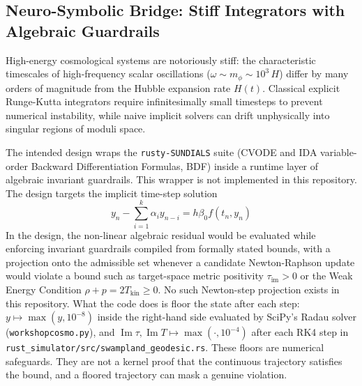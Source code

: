 \documentclass[11pt,a4paper]{article}
\begin{document}
\subsection{Neuro-Symbolic Bridge: Stiff Integrators with Algebraic Guardrails}
High-energy cosmological systems are notoriously stiff: the characteristic timescales of high-frequency scalar oscillations ($\omega \sim m_\phi \sim 10^3\,H$) differ by many orders of magnitude from the Hubble expansion rate $H(t)$. Classical explicit Runge-Kutta integrators require infinitesimally small timesteps to prevent numerical instability, while naive implicit solvers can drift unphysically into singular regions of moduli space.

The intended design wraps the \texttt{rusty-SUNDIALS} suite (CVODE and IDA variable-order Backward Differentiation Formulas, BDF) inside a runtime layer of algebraic invariant guardrails. This wrapper is not implemented in this repository. The design targets the implicit time-step solution
\begin{equation}
y_n - \sum_{i=1}^k \alpha_i y_{n-i} = h \beta_0 f(t_n, y_n)
\end{equation}
In the design, the non-linear algebraic residual would be evaluated while enforcing invariant guardrails compiled from formally stated bounds, with a projection onto the admissible set whenever a candidate Newton-Raphson update would violate a bound such as target-space metric positivity $\tau_{\text{im}} > 0$ or the Weak Energy Condition $\rho + p = 2 T_{\text{kin}} \ge 0$. No such Newton-step projection exists in this repository. What the code does is floor the state after each step: $y \mapsto \max(y, 10^{-8})$ inside the right-hand side evaluated by SciPy's Radau solver (\texttt{workshopcosmo.py}), and $\operatorname{Im}\tau, \operatorname{Im}T \mapsto \max(\cdot, 10^{-4})$ after each RK4 step in \texttt{rust\_simulator/src/swampland\_geodesic.rs}. These floors are numerical safeguards. They are not a kernel proof that the continuous trajectory satisfies the bound, and a floored trajectory can mask a genuine violation.
\end{document}
